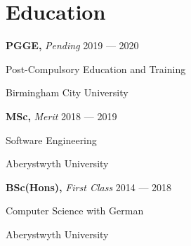 \section{Education}
\parbox[t][][t]{\linewidth}{
	\parbox{\linewidth}{\textbf{PGGE, }\textit{Pending} \hfill {{2019 --- 2020}}}
	\parbox{\linewidth}{Post-Compulsory Education and Training}
	\parbox{\linewidth}{{Birmingham City University}}
	\smallskip
}

\parbox[t][][t]{\linewidth}{
	\parbox{\linewidth}{\textbf{MSc, }\textit{Merit} \hfill {{2018 --- 2019}}}
	\parbox{\linewidth}{{Software Engineering}}
	\parbox{\linewidth}{{Aberystwyth University}}
	\smallskip
}

\parbox[t][][t]{\linewidth}{
	\parbox{\linewidth}{\textbf{BSc(Hons), }\textit{First Class} \hfill {{2014 --- 2018}}}
	\parbox{\linewidth}{{Computer Science with German}}
	\parbox{\linewidth}{{Aberystwyth University}}
}